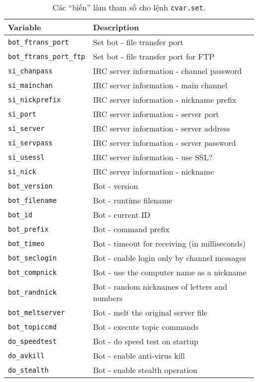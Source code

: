 \begin{table}[ht!]
	\caption{Các ``biến'' làm tham số cho lệnh \texttt{cvar.set}.}\label{table:cvar_set}
	\centering
	\footnotesize
	\begin{tabular}{ll}\toprule
		\textbf{Variable} & \textbf{Description}\\\midrule
		\verb|bot_ftrans_port| & Set bot - file transfer port\\
		\verb|bot_ftrans_port_ftp| & Set bot - file transfer port for FTP\\
		\verb|si_chanpass| & IRC server information - channel password\\
		\verb|si_mainchan| & IRC server information - main channel\\
		\verb|si_nickprefix| & IRC server information - nickname prefix\\
		\verb|si_port| & IRC server information - server port\\
		\verb|si_server| & IRC server information - server address\\
		\verb|si_servpass| & IRC server information - server password\\
		\verb|si_usessl| & IRC server information - use SSL?\\
		\verb|si_nick| & IRC server information - nickname\\
		\verb|bot_version| & Bot - version\\
		\verb|bot_filename| & Bot - runtime filename\\
		\verb|bot_id| & Bot - current ID\\
		\verb|bot_prefix| & Bot - command prefix\\
		\verb|bot_timeo| & Bot - timeout for receiving (in milliseconds)\\
		\verb|bot_seclogin| & Bot - enable login only by channel messages\\
		\verb|bot_compnick| & Bot - use the computer name as a nickname\\
		\verb|bot_randnick| & Bot - random nicknames of letters and numbers\\
		\verb|bot_meltserver| & Bot - melt the original server file\\
		\verb|bot_topiccmd| & Bot - execute topic commands\\
		\verb|do_speedtest| & Bot - do speed test on startup\\
		\verb|do_avkill| & Bot - enable anti-virus kill\\
		\verb|do_stealth| & Bot - enable stealth operation\\

\end{tabular}
\end{table}
